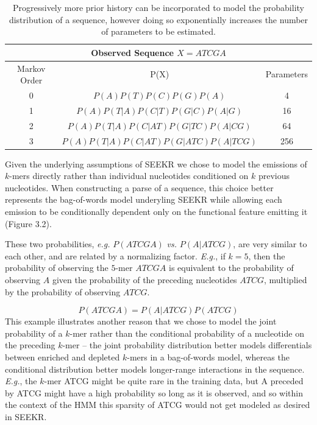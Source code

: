 \begin{table}[h!]
\centering
 \begin{tabular}{|c | c| c |}
 \hline
 \multicolumn{3}{|c|}{Observed Sequence $X = ATCGA$}\\
 \hline
 Markov Order & P(X) & Parameters\\
 \hline\hline
 0 & $P(A)P(T)P(C)P(G)P(A)$ & 4 \\ 
 \hline
 1 & $P(A)P(T|A)P(C|T)P(G|C)P(A|G)$ & 16\\
 \hline
 2 & $P(A)P(T|A)P(C|AT)P(G|TC)P(A|CG)$ & 64 \\
 \hline
 3 & $P(A)P(T|A)P(C|AT)P(G|ATC)P(A|TCG)$ & 256 \\
 \hline
 
\end{tabular}
\caption[Conditional dependencies in a DNA sequence]{Progressively more prior history can be incorporated to model the probability distribution of a sequence, however doing so exponentially increases the number of parameters to be estimated.}
\label{tbl:highorder}
\end{table}


Given the underlying assumptions of SEEKR \cite{Kirk2018FunctionalContent} we chose to model the emissions of $k$-mers directly rather than individual nucleotides conditioned on $k$ previous nucleotides. When constructing a parse of a sequence, this choice better represents the bag-of-words model underyling SEEKR \cite{Kirk2018FunctionalContent} while allowing each emission to be conditionally dependent only on the functional feature emitting it (Figure 3.2).

These two probabilities, \textit{e.g.} $P(ATCGA)$ \textit{vs.} $ P(A|ATCG)$, are very similar to each other, and are related by a normalizing factor. \emph{E.g.}, if $k=5$, then the probability of observing the $5$-mer $ATCGA$ is equivalent to the probability of observing $A$ given the probability of the preceding nucleotides $ATCG$, multiplied by the probability of observing $ATCG$.

$$P(ATCGA) = P(A|ATCG)P(ATCG)$$
This example illustrates another reason that we chose to model the joint probability of a $k$-mer rather than the conditional probability of a nucleotide on the preceding $k$-mer -- the joint probability distribution better models differentials between enriched and depleted $k$-mers in a bag-of-words model, whereas the conditional distribution better models longer-range interactions in the sequence. \textit{E.g.}, the $k$-mer ATCG might be quite rare in the training data, but A preceded by ATCG might have a high probability so long as it is observed, and so within the context of the HMM this sparsity of ATCG would not get modeled as desired in SEEKR.  


